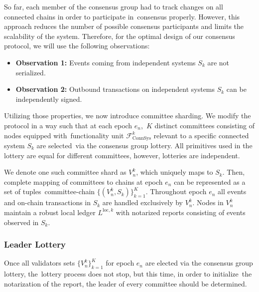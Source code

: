 So far, each member of the consensus group had to track changes on all connected chains in order to participate in\
consensus properly.
However, this approach reduces the number of possible consensus participants and limits the scalability of the system.
Therefore, for the optimal design of our consensus protocol, we will use the following observations:
\begin{itemize}
    \item[]\textbf{Observation 1:} Events coming from independent systems $S_k$ are not serialized.
    \item[]\textbf{Observation 2:} Outbound transactions on independent systems $S_k$ can be independently signed.
\end{itemize}

Utilizing those properties, we now introduce committee sharding.
We modify the protocol in a way such that at each epoch $e_n$,\
$K$ distinct committees consisting of nodes equipped with\
functionality unit $\mathcal{F}^k_{\text{ConnSys}}$ relevant to a specific connected system $S_k$ are selected\
via the consensus group lottery.
All primitives used in the lottery are equal for different committees, however, lotteries are independent.

We denote one such committee shard as $V_n^k$, which uniquely maps to $S_k$.
Then, complete mapping of committees to chains at epoch $e_n$ can be represented as a set of tuples\
committee-chain $\{(V_n^k, S_k)\}_{k=1}^K$.
Throughout epoch $e_n$ all events and on-chain transactions in $S_k$ are handled exclusively by $V_n^k$.
Nodes in $V_n^k$ maintain a robust local ledger $L^{\text{loc}, k}$ with notarized reports consisting of events observed in $S_k$.

\subsubsection{Leader Lottery}\label{subsubsec:leader-lottery}
Once all validators sets $\{V_n^k\}_{k=1}^K$ for epoch $e_n$ are elected via the consensus group lottery, the\
lottery process does not stop, but this time, in order to initialize\
the notarization of the report, the leader of every committee should be determined.

